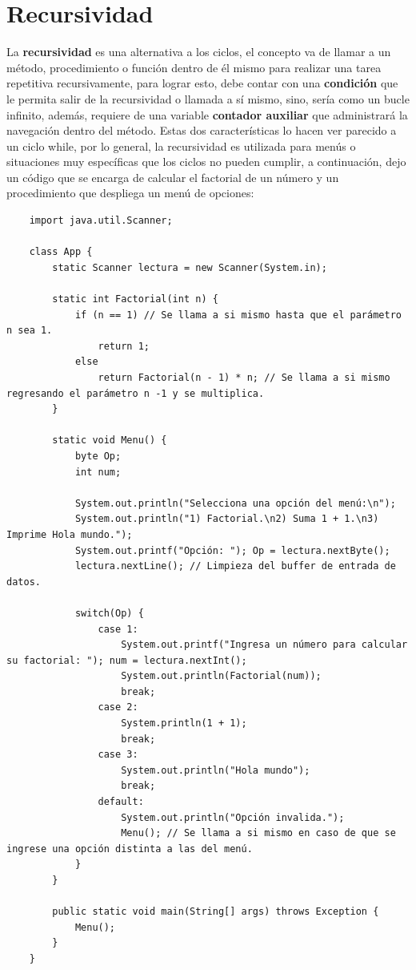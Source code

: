 \section{Recursividad}
\hspace{0.55cm}La \textbf{recursividad} es una alternativa a los ciclos, el concepto va de llamar a un método, procedimiento o función dentro de él mismo para realizar una tarea repetitiva recursivamente, para lograr esto, debe contar con una \textbf{condición} que le permita salir de la recursividad o llamada a sí mismo, sino, sería como un bucle infinito, además, requiere de una variable \textbf{contador auxiliar} que administrará la navegación dentro del método.
Estas dos características lo hacen ver parecido a un ciclo while, por lo general, la recursividad es utilizada para menús o situaciones muy específicas que los ciclos no pueden cumplir, a continuación, dejo un código que se encarga de calcular el factorial de un número y un procedimiento que despliega un menú de opciones:
\begin{lstlisting}
	import java.util.Scanner;

	class App {
		static Scanner lectura = new Scanner(System.in);	
	
		static int Factorial(int n) {
			if (n == 1) // Se llama a si mismo hasta que el parámetro n sea 1.
				return 1;
			else
				return Factorial(n - 1) * n; // Se llama a si mismo regresando el parámetro n -1 y se multiplica.
		}
		
		static void Menu() {
			byte Op;
			int num;
			
			System.out.println("Selecciona una opción del menú:\n");
			System.out.println("1) Factorial.\n2) Suma 1 + 1.\n3) Imprime Hola mundo.");
			System.out.printf("Opción: "); Op = lectura.nextByte();
			lectura.nextLine(); // Limpieza del buffer de entrada de datos.
			
			switch(Op) {
				case 1:
					System.out.printf("Ingresa un número para calcular su factorial: "); num = lectura.nextInt();
					System.out.println(Factorial(num));
					break;
				case 2:
					System.println(1 + 1);
					break;
				case 3:
					System.out.println("Hola mundo");
					break;
				default:
					System.out.println("Opción invalida.");
					Menu(); // Se llama a si mismo en caso de que se ingrese una opción distinta a las del menú.
			}
		}
	
		public static void main(String[] args) throws Exception {
			Menu();
		}
	}
\end{lstlisting}



